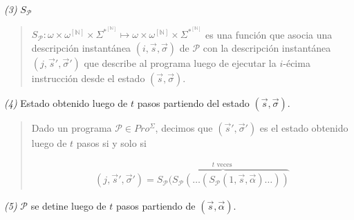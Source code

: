 \documentclass[a4paper, 12pt]{article}
\begin{document}
\textit{(3)} $S_\mathcal{P}$


\small
\begin{quote}

    $ S_{\mathcal{P}} : \omega \times \omega^{[\mathbb{N}]} \times
    \Sigma^{*}^{[\mathbb{N}]} \mapsto \omega \times  \omega^{[\mathbb{N}]}
    \times  \Sigma^{*}^{[\mathbb{N}]}$ es una función que asocia una descripción
    instantánea $(i, \vec{s}, \vec{\sigma})$ de $\mathcal{P}$ con la descripción
    instantánea $(j, \vec{s}', \vec{\sigma}')$ que describe al programa luego
    de ejecutar la $i$-écima instrucción desde el estado $(\vec{s},
    \vec{\sigma})$.


\end{quote}
\normalsize

\textit{(4)} Estado obtenido luego de $t$ pasos partiendo del estado $(\vec{s},
\vec{\sigma})$.


\small
\begin{quote}

Dado un programa $\mathcal{P} \in Pro^{\Sigma}$, decimos que $(\vec{s}',
\vec{\sigma}')$ es el estado obtenido luego de $t$ pasos si y solo si 

\begin{align*}
    (j, \vec{s}', \vec{\sigma}') = \overbrace{S_{\mathcal{P}} (S_{\mathcal{P}}( \ldots (S_{\mathcal{P}}(1,
    \vec{s}, \vec{\alpha}) \ldots ))}^{t \text{ veces }}
\end{align*}

\end{quote}
\normalsize

\textit{(5)} $\mathcal{P}$ se detine luego de $t$ pasos partiendo de $(\vec{s},
\vec{\alpha})$.
\end{document}
